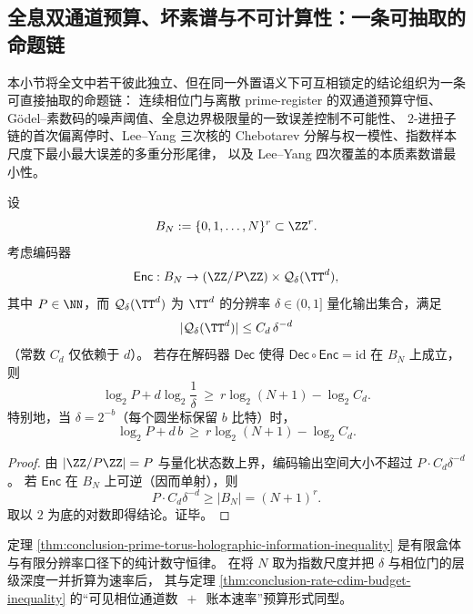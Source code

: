 \subsection{全息双通道预算、坏素谱与不可计算性：一条可抽取的命题链}\label{subsec:conclusion-holographic-proposition-chain}
本小节将全文中若干彼此独立、但在同一外置语义下可互相锁定的结论组织为一条可直接抽取的命题链：
连续相位门与离散 prime-register 的双通道预算守恒、Gödel--素数码的噪声阈值、全息边界极限量的一致误差控制不可能性、
\(2\)-进扭子链的首次偏离停时、Lee--Yang 三次核的 Chebotarev 分解与权一模性、指数样本尺度下最小最大误差的多重分形尾律，
以及 Lee--Yang 四次覆盖的本质素数谱最小性。

\begin{theorem}[圆维–素数寄存器双通道的全息信息守恒不等式]\label{thm:conclusion-prime-torus-holographic-information-inequality}
设
\[
B_N:=\{0,1,\dots,N\}^r\subset\ZZ^r.
\]
考虑编码器
\[
\mathsf{Enc}:B_N\to (\ZZ/P\ZZ)\times \mathcal Q_\delta(\TT^d),
\]
其中 \(P\in\NN\)，而 \(\mathcal Q_\delta(\TT^d)\) 为 \(\TT^d\) 的分辨率 \(\delta\in(0,1]\) 量化输出集合，满足
\[
|\mathcal Q_\delta(\TT^d)|\le C_d\,\delta^{-d}
\]
（常数 \(C_d\) 仅依赖于 \(d\)）。
若存在解码器 \(\mathsf{Dec}\) 使得 \(\mathsf{Dec}\circ\mathsf{Enc}=\mathrm{id}\) 在 \(B_N\) 上成立，则
\[
\log_2 P+d\log_2\frac{1}{\delta}\ \ge\ r\log_2(N+1)-\log_2 C_d.
\]
特别地，当 \(\delta=2^{-b}\)（每个圆坐标保留 \(b\) 比特）时，
\[
\log_2 P+d\,b\ \ge\ r\log_2(N+1)-\log_2 C_d.
\]
\end{theorem}
\begin{proof}
由 \(|\ZZ/P\ZZ|=P\) 与量化状态数上界，编码输出空间大小不超过 \(P\cdot C_d\delta^{-d}\)。
若 \(\mathsf{Enc}\) 在 \(B_N\) 上可逆（因而单射），则
\[
P\cdot C_d\delta^{-d}\ge |B_N|=(N+1)^r.
\]
取以 \(2\) 为底的对数即得结论。证毕。
\end{proof}

\begin{remark}[与速率圆维预算口径的一致性]\label{rem:conclusion-prime-torus-holographic-information-inequality-rate-alignment}
定理 \ref{thm:conclusion-prime-torus-holographic-information-inequality} 是有限盒体与有限分辨率口径下的纯计数守恒律。
在将 \(N\) 取为指数尺度并把 \(\delta\) 与相位门的层级深度一并折算为速率后，
其与定理 \ref{thm:conclusion-rate-cdim-budget-inequality} 的“可见相位通道数 \(\,+\,\) 账本速率”预算形式同型。
\end{remark}

